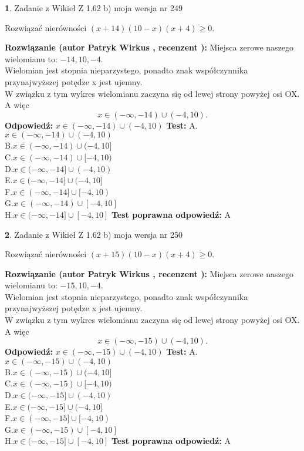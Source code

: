 \documentclass[12pt, a4paper]{article}
\theoremstyle{definition} %
\newtheorem{zad}{}
\newcommand{\zadStart}[1]{\begin{zad}#1\newline}
\newcommand{\zadStop}{\end{zad}}
\newcommand{\rozwStart}[2]{\noindent \textbf{Rozwiązanie (autor #1 , recenzent #2): }\newline}
\newcommand{\rozwStop}{\newline}
\newcommand{\odpStart}{\noindent \textbf{Odpowiedź:}\newline}
\newcommand{\odpStop}{\newline}
\newcommand{\testStart}{\noindent \textbf{Test:}\newline}
\newcommand{\testStop}{\newline}
\newcommand{\kluczStart}{\noindent \textbf{Test poprawna odpowiedź:}\newline}
\newcommand{\kluczStop}{\newline}
\begin{document}
\zadStart{Zadanie z Wikieł Z 1.62 b) moja wersja nr 249}

Rozwiązać nierówności $(x+14)(10-x)(x+4)\ge0$.
\zadStop
\rozwStart{Patryk Wirkus}{}
Miejsca zerowe naszego wielomianu to: $-14, 10, -4$.\\
Wielomian jest stopnia nieparzystego, ponadto znak współczynnika przy\linebreak najwyższej potędze x jest ujemny.\\ W związku z tym wykres wielomianu zaczyna się od lewej strony powyżej osi OX. A więc $$x \in (-\infty,-14) \cup (-4,10).$$
\rozwStop
\odpStart
$x \in (-\infty,-14) \cup (-4,10)$
\odpStop
\testStart
A.$x \in (-\infty,-14) \cup (-4,10)$\\
B.$x \in (-\infty,-14) \cup (-4,10]$\\
C.$x \in (-\infty,-14) \cup [-4,10)$\\
D.$x \in (-\infty,-14] \cup (-4,10)$\\
E.$x \in (-\infty,-14] \cup (-4,10]$\\
F.$x \in (-\infty,-14] \cup [-4,10)$\\
G.$x \in (-\infty,-14) \cup [-4,10]$\\
H.$x \in (-\infty,-14] \cup [-4,10]$
\testStop
\kluczStart
A
\kluczStop



\zadStart{Zadanie z Wikieł Z 1.62 b) moja wersja nr 250}

Rozwiązać nierówności $(x+15)(10-x)(x+4)\ge0$.
\zadStop
\rozwStart{Patryk Wirkus}{}
Miejsca zerowe naszego wielomianu to: $-15, 10, -4$.\\
Wielomian jest stopnia nieparzystego, ponadto znak współczynnika przy\linebreak najwyższej potędze x jest ujemny.\\ W związku z tym wykres wielomianu zaczyna się od lewej strony powyżej osi OX. A więc $$x \in (-\infty,-15) \cup (-4,10).$$
\rozwStop
\odpStart
$x \in (-\infty,-15) \cup (-4,10)$
\odpStop
\testStart
A.$x \in (-\infty,-15) \cup (-4,10)$\\
B.$x \in (-\infty,-15) \cup (-4,10]$\\
C.$x \in (-\infty,-15) \cup [-4,10)$\\
D.$x \in (-\infty,-15] \cup (-4,10)$\\
E.$x \in (-\infty,-15] \cup (-4,10]$\\
F.$x \in (-\infty,-15] \cup [-4,10)$\\
G.$x \in (-\infty,-15) \cup [-4,10]$\\
H.$x \in (-\infty,-15] \cup [-4,10]$
\testStop
\kluczStart
A
\kluczStop
\end{document}
